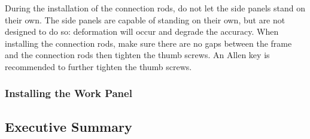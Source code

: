 \documentclass[titlepage,10pt,letter]{report}
\numberwithin{equation}{chapter}
\begin{document}
During the installation of the connection rods, do not let the side panels stand on their own. The side panels are capable of standing on their own, but are not designed to do so: deformation will occur and degrade the accuracy. When installing the connection rods, make sure there are no gaps between the frame and the connection rods then tighten the thumb screws. An Allen key is recommended to further tighten the thumb screws.

\subsection{Installing the Work Panel}



\newpage
\begin{appendices}
\chapter{Executive Summary}

\end{appendices}
\end{document}
